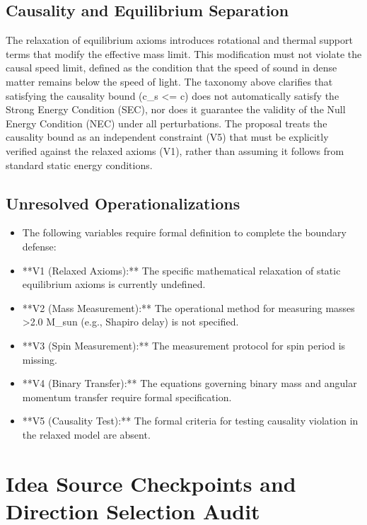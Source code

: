 \documentclass[conference]{IEEEtran}
\begin{document}
\subsection{Causality and Equilibrium Separation}
The relaxation of equilibrium axioms introduces rotational and thermal support terms that modify the effective mass limit. This modification must not violate the causal speed limit, defined as the condition that the speed of sound in dense matter remains below the speed of light. The taxonomy above clarifies that satisfying the causality bound (c\_s <= c) does not automatically satisfy the Strong Energy Condition (SEC), nor does it guarantee the validity of the Null Energy Condition (NEC) under all perturbations. The proposal treats the causality bound as an independent constraint (V5) that must be explicitly verified against the relaxed axioms (V1), rather than assuming it follows from standard static energy conditions.

\subsection{Unresolved Operationalizations}
\begin{itemize}
\item The following variables require formal definition to complete the boundary defense:
\item **V1 (Relaxed Axioms):** The specific mathematical relaxation of static equilibrium axioms is currently undefined.
\item **V2 (Mass Measurement):** The operational method for measuring masses >2.0 M\_sun (e.g., Shapiro delay) is not specified.
\item **V3 (Spin Measurement):** The measurement protocol for spin period is missing.
\item **V4 (Binary Transfer):** The equations governing binary mass and angular momentum transfer require formal specification.
\item **V5 (Causality Test):** The formal criteria for testing causality violation in the relaxed model are absent.
\end{itemize}

\section{Idea Source Checkpoints and Direction Selection Audit}
\end{document}
